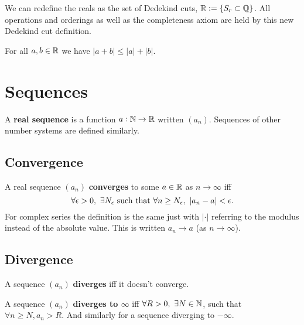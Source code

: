 \documentclass{article}
\begin{document}
\begin{theorem}
    We can redefine the reals as the set of Dedekind cuts, $\mathbb{R}:= \{S_r\subset\mathbb{Q}\}$. All operations and orderings as well as the completeness axiom are held by this new Dedekind cut definition.
\end{theorem}

\begin{theorem}
    For all $a,b\in\mathbb{R}$ we have $|a+b|\leq |a|+|b|$.
\end{theorem}

\section{Sequences}

\begin{definition}
    A \textbf{real sequence} is a function $a:\mathbb{N}\rightarrow\mathbb{R}$ written $(a_n)$. Sequences of other number systems are defined similarly.
\end{definition}

\subsection{Convergence}

\begin{definition}
    A real sequence $(a_n)$ \textbf{converges} to some $a\in\mathbb{R}$  as $n\rightarrow\infty$ iff \[
    \forall \epsilon>0, \  \exists N_\epsilon \ \text{\textcolor{black}{such that }} \forall n\geq N_\epsilon, \ |a_n-a|<\epsilon
    \textcolor{black}{.}
    \] For complex series the definition is the same just with $|\cdot|$ referring to the modulus instead of the absolute value. This is written $a_n\rightarrow a$ (as $n\rightarrow\infty$).
\end{definition}

\subsection{Divergence}

\begin{definition}[Divergence]
    A sequence $(a_n)$ \textbf{diverges} iff it doesn't converge.
\end{definition}

\begin{definition}
    A sequence $(a_n)$ \textbf{diverges to $\infty$} iff $\forall R>0, \ \exists N\in\mathbb{N}$, such that $\forall n\geq N, a_n>R$. And similarly for a sequence diverging to $-\infty$.
\end{definition}
\end{document}
